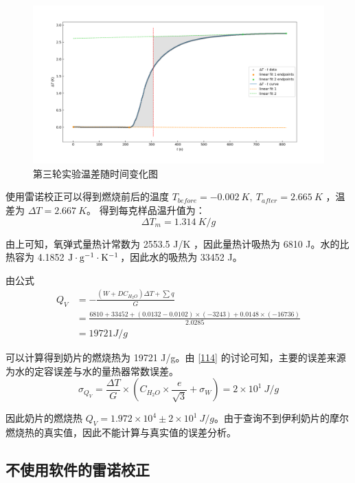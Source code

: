 \documentclass[cn,hazy,pku,12pt,normal,math=newtx,cite=super]{elegantnote}
\begin{document}
\begin{figure}[htbp]
    \centering
    \includegraphics[width = .90\textwidth]{image/r3.png}
    \caption{第三轮实验温差随时间变化图}\label{7}
\end{figure}

使用雷诺校正可以得到燃烧前后的温度 $T_{before} = -0.002\ K,\ T_{after} = 2.665\ K$ ，温差为 $\Delta T = 2.667\ K$。
得到每克样品温升值为：
$$
\Delta T_m = 1.314\ K/g
$$

由上可知，氧弹式量热计常数为 2553.5 J/K ，因此量热计吸热为 6810 J。水的比热容为 4.1852 $\rm J\cdot g^{-1}\cdot K^{-1}$，因此水的吸热为
33452 J。

由公式
\begin{equation*}
    \begin{split}
    Q_V &= - \frac{(W+DC_{H_2O})\Delta T + \sum{q}}{G}  \\
        &=  \frac{ 6810 + 33452 + ( 0.0132 - 0.0102)\times (-3243) +  0.0148 \times (- 16736)}{2.0285} \\
        &= 19721 J/g
    \end{split}
\end{equation*}

可以计算得到奶片的燃烧热为 19721 J/g。由 \ref{114} 的讨论可知，主要的误差来源为水的定容误差与水的量热器常数误差。
$$
\sigma_{Q_V} = \frac{\Delta T}{G}  \times (C_{H_2O} \times \frac{e}{\sqrt{3}} + \sigma_W)  = 2 \times 10^1\ J/g
$$

因此奶片的燃烧热 $Q_V = 1.972 \times 10^4 \pm 2 \times 10^1\ J/g$。由于查询不到伊利奶片的摩尔燃烧热的真实值，因此不能计算与真实值的误差分析。

\subsection[short]{不使用软件的雷诺校正}
\end{document}
